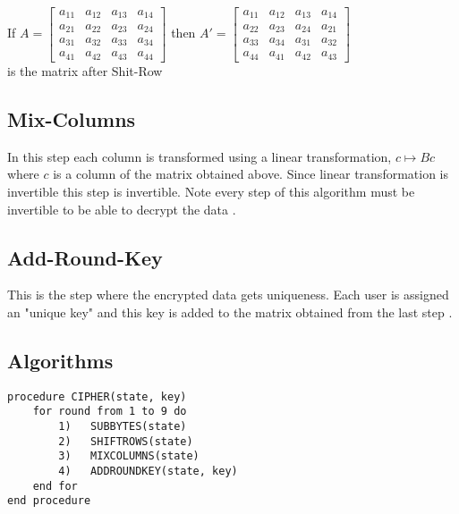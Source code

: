 \vspace{3mm}
If \(A=\begin{bmatrix}
    a_{11}&a_{12}&a_{13}&a_{14}\\
    a_{21}&a_{22}&a_{23}&a_{24}\\
    a_{31}&a_{32}&a_{33}&a_{34}\\
    a_{41}&a_{42}&a_{43}&a_{44}
    \end{bmatrix}\) \hspace{3mm} then \(A'=\begin{bmatrix}
    a_{11}&a_{12}&a_{13}&a_{14}\\
    a_{22}&a_{23}&a_{24}&a_{21}\\
    a_{33}&a_{34}&a_{31}&a_{32}\\
    a_{44}&a_{41}&a_{42}&a_{43}
    \end{bmatrix}\) \vspace{2mm} \\[3mm] is the matrix after Shit-Row

\subsection{Mix-Columns}
In this step each column is transformed using a linear transformation, \(c \mapsto Bc\) where \(c\) is a column of the matrix obtained above. Since linear transformation is invertible this step is invertible. Note every step of this algorithm must be invertible to be able to decrypt the data \cite{aes}.

\subsection{Add-Round-Key}
This is the step where the encrypted data gets uniqueness. Each user is assigned an "unique key" and this key is added to the matrix obtained from the last step \cite{aes}.

\subsection{Algorithms}
\begin{tcolorbox}[colback=gray!20, colframe=blue!30, left=2cm, title={\small \bfseries \textcolor{black}{Encryption Algorithm}}, width=15cm]
\begin{verbatim}
procedure CIPHER(state, key)
    for round from 1 to 9 do
        1)   SUBBYTES(state)
        2)   SHIFTROWS(state)
        3)   MIXCOLUMNS(state)
        4)   ADDROUNDKEY(state, key)
    end for
end procedure
\end{verbatim}
\end{tcolorbox}

